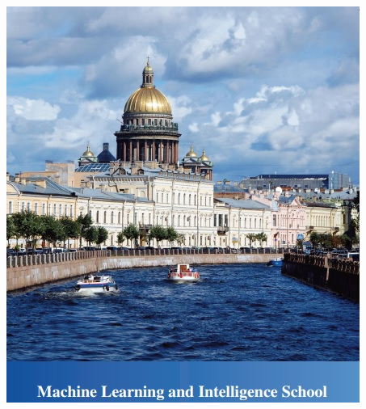 \documentclass{beamer}
\begin{document}
\begin{frame}
\\
\includegraphics[width=\textwidth, height=0.8\paperheight, keepaspectratio]{stpete.jpg}
\end{frame}
\end{document}
